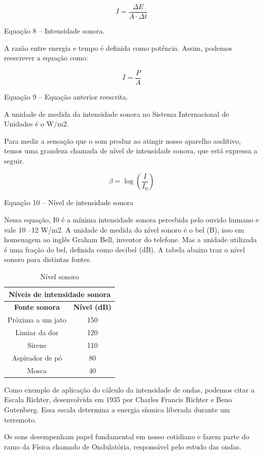 $$
I = \frac{\Delta E}{A\cdot \Delta t}
$$

\begin{center}
    Equação 8 – Intensidade sonora.
\end{center}

A razão entre energia e tempo é definida como potência. Assim, podemos reescrever a equação como:

$$
I = \frac{P}{A}
$$
\begin{center}
    Equação 9 – Equação anterior reescrita.
\end{center}

A unidade de medida da intensidade sonora no Sistema Internacional de Unidades é o W/m2.

Para medir a sensação que o som produz ao atingir nosso aparelho auditivo, temos uma grandeza chamada de nível de intensidade sonora, que está expressa a seguir.

$$
\beta = \log\left ( \frac{I}{I_{0}} \right )
$$
\begin{center}
    Equação 10 – Nível de intensidade sonora
\end{center}

Nessa equação, I0 é a mínima intensidade sonora percebida pelo ouvido humano e vale 10 –12 W/m2. A unidade de medida do nível sonoro é o bel (B), isso em homenagem ao inglês Graham Bell, inventor do telefone. Mas a unidade utilizada é uma fração do bel, definida como decibel (dB). A tabela abaixo traz o nível sonoro para distintas fontes.

\begin{table}[hb]
\centering
\begin{tabular}{|cc|}
\hline
\multicolumn{2}{|c|}{\textbf{Níveis de intensidade sonora}}       \\ \hline
\multicolumn{1}{|c|}{\textbf{Fonte sonora}} & \textbf{Nível (dB)} \\ \hline
\multicolumn{1}{|c|}{Próxima a um jato}     & 150                 \\ \hline
\multicolumn{1}{|c|}{Limiar da dor}         & 120                 \\ \hline
\multicolumn{1}{|c|}{Sirene}                & 110                 \\ \hline
\multicolumn{1}{|c|}{Aspirador de pó}       & 80                  \\ \hline
\multicolumn{1}{|c|}{Mosca}                 & 40                  \\ \hline
\end{tabular}
\caption{Nível sonoro}
\end{table}

Como exemplo de aplicação do cálculo da intensidade de ondas, podemos citar a Escala Richter, desenvolvida em 1935 por Charles Francis Richter e Beno Gutenberg. Essa escala determina a energia sísmica liberada durante um terremoto.

Os sons desempenham papel fundamental em nosso cotidiano e fazem parte do ramo da Física chamado de Ondulatória, responsável pelo estudo das ondas.